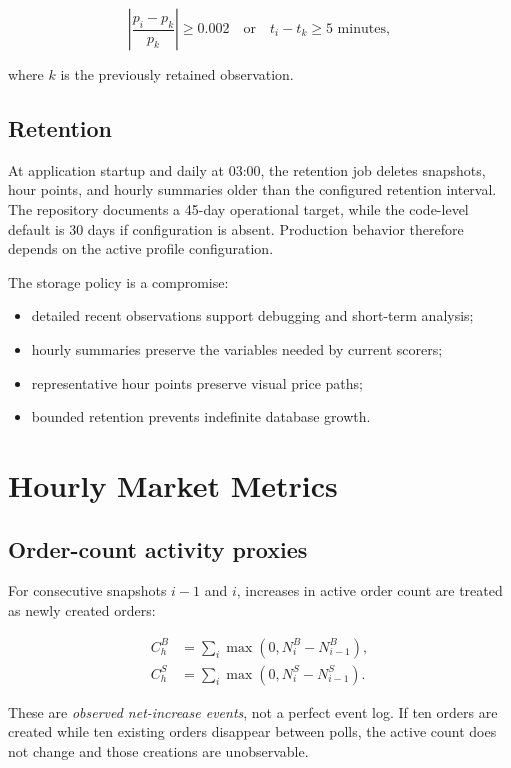 \documentclass[11pt,a4paper]{article}
\begin{document}
\begin{equation}
\left|\frac{p_i-p_k}{p_k}\right|\ge 0.002
\quad\text{or}\quad
t_i-t_k\ge 5\text{ minutes},
\end{equation}

where $k$ is the previously retained observation.

\subsection{Retention}

At application startup and daily at 03:00, the retention job deletes snapshots, hour points,
and hourly summaries older than the configured retention interval. The repository documents
a 45-day operational target, while the code-level default is 30 days if configuration is
absent. Production behavior therefore depends on the active profile configuration.

The storage policy is a compromise:

\begin{itemize}
  \item detailed recent observations support debugging and short-term analysis;
  \item hourly summaries preserve the variables needed by current scorers;
  \item representative hour points preserve visual price paths;
  \item bounded retention prevents indefinite database growth.
\end{itemize}

\section{Hourly Market Metrics}

\subsection{Order-count activity proxies}

For consecutive snapshots $i-1$ and $i$, increases in active order count are treated as
newly created orders:

\begin{align}
C_h^B &= \sum_i \max(0,N_i^B-N_{i-1}^B),\\
C_h^S &= \sum_i \max(0,N_i^S-N_{i-1}^S).
\end{align}

These are \emph{observed net-increase events}, not a perfect event log. If ten orders are
created while ten existing orders disappear between polls, the active count does not change
and those creations are unobservable.
\end{document}
